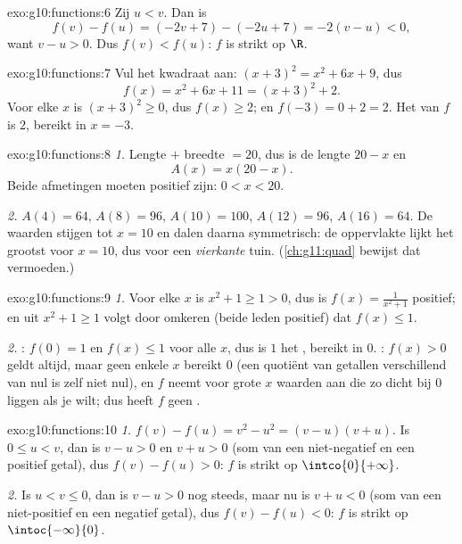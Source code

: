 \begin{solution}{exo:g10:functions:6}
Zij $u < v$. Dan is
\[
f(v) - f(u) = (-2v + 7) - (-2u + 7) = -2(v - u) < 0,
\]
want $v - u > 0$. Dus $f(v) < f(u)$: $f$ is strikt  op $\R$.
\end{solution}

\begin{solution}{exo:g10:functions:7}
Vul het kwadraat aan: $(x+3)^2 = x^2 + 6x + 9$, dus
\[
f(x) = x^2 + 6x + 11 = (x + 3)^2 + 2 .
\]
Voor elke $x$ is $(x+3)^2 \geq 0$, dus $f(x) \geq 2$; en
$f(-3) = 0 + 2 = 2$. Het  van $f$ is $2$, bereikt in $x = -3$.
\end{solution}

\begin{solution}{exo:g10:functions:8}
\emph{1.} Lengte $+$ breedte $= 20$, dus is de lengte $20 - x$ en
\[
A(x) = x(20 - x).
\]
Beide afmetingen moeten positief zijn: $0 < x < 20$.

\emph{2.} $A(4) = 64$, $A(8) = 96$, $A(10) = 100$, $A(12) = 96$,
$A(16) = 64$. De waarden stijgen tot $x = 10$ en dalen daarna symmetrisch:
de oppervlakte lijkt het grootst voor $x = 10$, dus voor een
\emph{vierkante} tuin. (\cref{ch:g11:quad} bewijst dat vermoeden.)
\end{solution}

\begin{solution}{exo:g10:functions:9}
\emph{1.} Voor elke $x$ is $x^2 + 1 \geq 1 > 0$, dus is
$f(x) = \frac{1}{x^2+1}$ positief; en uit $x^2 + 1 \geq 1$ volgt door
omkeren (beide leden positief) dat $f(x) \leq 1$.

\emph{2.} : $f(0) = 1$ en $f(x) \leq 1$ voor alle $x$, dus is $1$ het
, bereikt in $0$. : $f(x) > 0$ geldt altijd, maar geen enkele
$x$ bereikt $0$ (een quotiënt van getallen verschillend van nul is zelf niet
nul), en $f$ neemt voor grote $x$ waarden aan die zo dicht bij $0$ liggen
als je wilt; dus heeft $f$ geen .
\end{solution}

\begin{solution}{exo:g10:functions:10}
\emph{1.} $f(v) - f(u) = v^2 - u^2 = (v-u)(v+u)$. Is $0 \leq u < v$, dan is
$v - u > 0$ en $v + u > 0$ (som van een niet-negatief en een positief
getal), dus $f(v) - f(u) > 0$: $f$ is strikt  op
$\intco{0}{+\infty}$.

\emph{2.} Is $u < v \leq 0$, dan is $v - u > 0$ nog steeds, maar nu is
$v + u < 0$ (som van een niet-positief en een negatief getal), dus
$f(v) - f(u) < 0$: $f$ is strikt  op $\intoc{-\infty}{0}$.
\end{solution}

